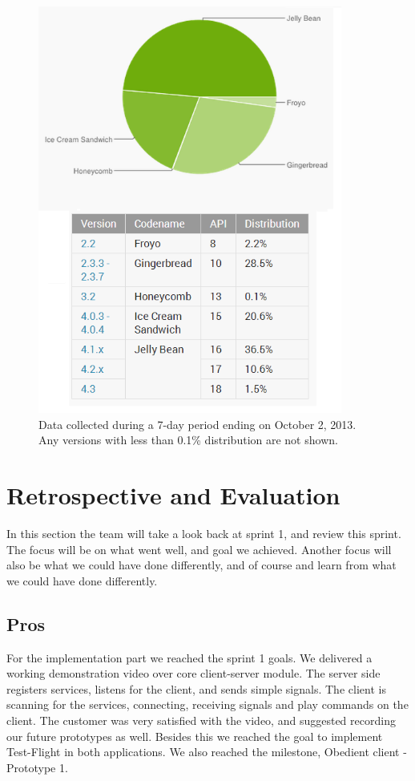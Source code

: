 \begin{figure}[H]
	\centering
		\includegraphics[width=10cm]{sprint1/android_platform_chart.png}
	\caption{Data collected during a 7-day period ending on October 2, 2013. 
	Any versions with less than 0.1\% distribution are not shown.}
	\label{fig:Platform_chart }
\end{figure}

\section{Retrospective and Evaluation}
In this section the team will take a look back at sprint 1, and review this sprint. The focus will be on what went well, and goal we achieved. Another focus will also be what we could have done differently, and of course and learn from what we could have done differently.

\subsection{Pros}
For the implementation part we reached the sprint 1 goals. We delivered a working demonstration video over core client-server module. The server side registers services, listens for the client, and sends simple  signals. The client is scanning for the services, connecting, receiving signals and play commands on the client. The customer was very satisfied with the video, and suggested recording our future prototypes as well. Besides this we reached the goal to implement Test-Flight in both applications. We also reached the milestone, Obedient client - Prototype 1.

